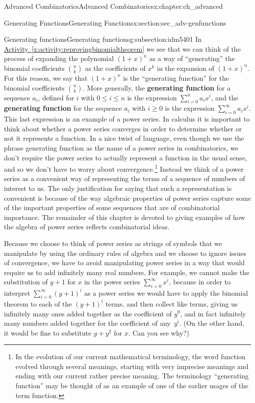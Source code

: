 \documentclass[oneside,10pt,]{book}
\newcommand{\terminology}[1]{\textbf{#1}}
\numberwithin{equation}{chapter}
\begin{document}
\begin{chapterptx}{Advanced Combinatorics}{}{Advanced Combinatorics}{}{}{x:chapter:ch_advanced}
\begin{sectionptx}{Generating Functions}{}{Generating Functions}{}{}{x:section:sec_adv-genfunctions}
\begin{subsectionptx}{Generating functions}{}{Generating functions}{}{}{g:subsection:idm5401}
In \hyperref[x:activity:reprovingbinomialtheorem]{Activity~\ref{x:activity:reprovingbinomialtheorem}} we see that we can think of the process of expanding the polynomial \((1+x)^n\) as a way of ``generating'' the binomial coefficients \(\binom{n}{k}\) as the coefficients of \(x^k\) in the expansion of \((1+x)^n\). For this reason, we say that \((1+x)^n\) is the ``generating function'' for the binomial coefficients \(\binom{n}{k}\). More generally, the \terminology{generating function} for a sequence \(a_i\), defined for \(i\) with \(0\le i\le n\) is the expression \(\sum_{i=0}^n a_ix^i\), and the \terminology{generating function} for the sequence \(a_i\) with \(i\ge 0\) is the expression \(\sum_{i=0}^\infty a_ix^i\). This last expression is an example of a power series. In calculus it is important to think about whether a power series converges in order to determine whether or not it represents a function. In a nice twist of language, even though we use the phrase generating function as the name of a power series in combinatorics, we don't require the power series to actually represent a function in the usual sense, and so we don't have to worry about convergence.\footnote{In the evolution of our current mathematical terminology, the word function evolved through several meanings, starting with very imprecise meanings and ending with our current rather precise meaning.  The terminology ``generating function'' may be thought of as an example of one of the earlier usages of the term function.\label{g:fn:idm5520}} Instead we think of a power series as a convenient way of representing the terms of a sequence of numbers of interest to us. The only justification for saying that such a representation is convenient is because of the way algebraic properties of power series capture some of the important properties of some sequences that are of combinatorial importance. The remainder of this chapter is devoted to giving examples of how the algebra of power series reflects combinatorial ideas.%
\par
Because we choose to think of power series as strings of symbols that we manipulate by using the ordinary rules of algebra and we choose to ignore issues of convergence, we have to avoid manipulating power series in a way that would require us to add infinitely many real numbers. For example, we cannot make the substitution of \(y+1\) for \(x\) in the power series \(\sum_{i=0}^\infty x^i\), because in order to interpret \(\sum_{i=0}^\infty (y+1)^i\) as a power series we would have to apply the binomial theorem to each of the \((y+1)^i\) terms, and then collect like terms, giving us infinitely many ones added together as the coefficient of \(y^0\), and in fact infinitely many numbers added together for the coefficient of any~\(y^i\). (On the other hand, it would be fine to substitute \(y+y^2\) for \(x\). Can you see why?)%

\end{subsectionptx}
\end{sectionptx}
\end{chapterptx}
\end{document}
